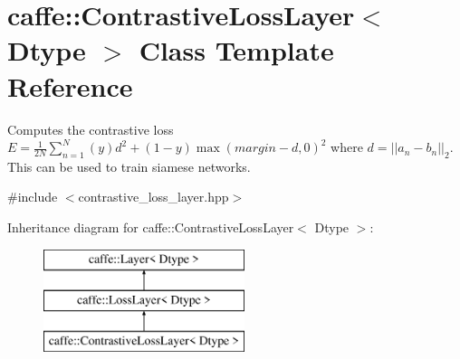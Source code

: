 \hypertarget{classcaffe_1_1ContrastiveLossLayer}{}\section{caffe\+:\+:Contrastive\+Loss\+Layer$<$ Dtype $>$ Class Template Reference}
\label{classcaffe_1_1ContrastiveLossLayer}


Computes the contrastive loss $ E = \frac{1}{2N} \sum\limits_{n=1}^N \left(y\right) d^2 + \left(1-y\right) \max \left(margin-d, 0\right)^2 $ where $ d = \left| \left| a_n - b_n \right| \right|_2 $. This can be used to train siamese networks.  




{\ttfamily \#include $<$contrastive\+\_\+loss\+\_\+layer.\+hpp$>$}

Inheritance diagram for caffe\+:\+:Contrastive\+Loss\+Layer$<$ Dtype $>$\+:\begin{figure}[H]
\begin{center}
\leavevmode
\includegraphics[height=3.000000cm]{classcaffe_1_1ContrastiveLossLayer}
\end{center}
\end{figure}
